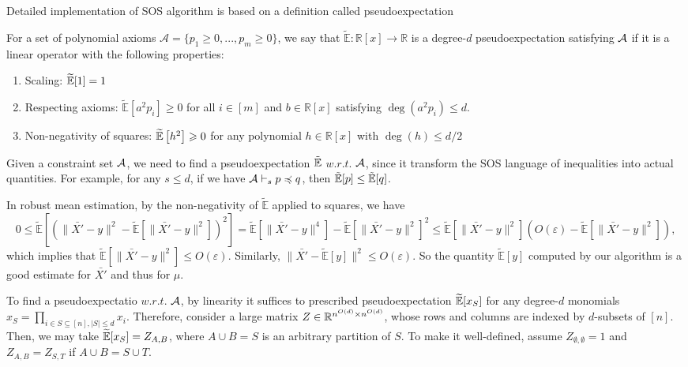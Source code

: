 Detailed implementation of SOS algorithm is based on a definition called pseudoexpectation
\begin{defn}
    \label{pseudo_expe}
    For a set of polynomial axioms $\mathcal{A}=\{p_1\ge 0,...,p_m\ge 0\}$, we say that $\widetilde{\mathbb{E}}: \mathbb{R}[x] \rightarrow \mathbb{R}$ is a degree-$d$ pseudoexpectation satisfying $\mathcal{A}$ if it is a linear operator with the following properties:
    \begin{enumerate}
        \item Scaling: $\widetilde{\mathrm{\mathbb{E}}}[1]=1$
        \item Respecting axioms: $\widetilde{\mathbb{E}}\left[a^2 p_i\right] \geqslant 0$ for all $i \in[m]$ and $b \in \mathbb{R}[x]$ satisfying $\operatorname{deg}\left(a^2 p_i\right) \leqslant d$.
        \item Non-negativity of squares: $\widetilde{\mathrm{\mathbb{E}}}\left[h^2\right] \geqslant 0$ for any polynomial $h \in \mathbb{R}[x]$ with $\operatorname{deg}(h) \leqslant d / 2$
    \end{enumerate}

\end{defn}
Given a constraint set $\mathcal{A}$, we need to find a pseudoexpectation $\tilde{\mathbb{E}}$ $w.r.t.$ $\mathcal{A}$, since it transform the SOS language of inequalities into actual quantities.
For example, for any $s\le d$, if we have $\mathcal{A}\vdash_s p\preccurlyeq q$, then $\tilde{\mathbb{E}}[p]\le \tilde{\mathbb{E}}[q]$.

In robust mean estimation, by the non-negativity of $\widetilde{\mathbb{E}}$ applied to squares, we have
$$
0 \le \widetilde{\mathbb{E}}\left[\left(\|\bar{X'}-y\|^2-\widetilde{\mathbb{E}}\left[\|\bar{X'}-y\|^2\right]\right)^2\right]=\widetilde{\mathbb{E}}\left[\|\bar{X'}-y\|^4\right]-\widetilde{\mathbb{E}}\left[\|\bar{X'}-y\|^2\right]^2 \leqslant \widetilde{\mathbb{E}}\left[\|\bar{X'}-y\|^2\right]\left(O(\varepsilon)-\widetilde{\mathbb{E}}\left[\|\bar{X'}-y\|^2\right]\right),
$$
which implies that $\widetilde{\mathbb{E}}\left[\|\bar{X'}-y\|^2\right] \leqslant O(\varepsilon)$. Similarly, $\|\bar{X'}-\widetilde{\mathbb{E}}[y]\|^2 \leqslant O(\varepsilon)$. So the quantity $\widetilde{\mathbb{E}}[y]$ computed by our algorithm is a good estimate for $\bar{X'}$ and thus for $\mu$.

To find a pseudoexpectatio $w.r.t.$ $\mathcal{A}$, by linearity it suffices to prescribed pseudoexpectation $\widetilde{\mathbb{E}}[x_S]$ for any degree-$d$ monomials $x_S=\prod_{i\in S\subseteq[n],|S|\le d}x_i$. Therefore, consider a large matrix $Z\in\mathbb{R}^{n^{O(d)}\times n^{O(d)}}$, whose rows and columns are indexed by $d$-subsets of $[n]$. Then, we may take $\widetilde{\mathbb{E}}[x_{S}]=Z_{A,B}$, where $A\cup B=S$ is an arbitrary partition of $S$. To make it well-defined, assume $Z_{\emptyset,\emptyset}=1$ and $Z_{A,B}=Z_{S,T}$ if $A\cup B=S\cup T$. 

